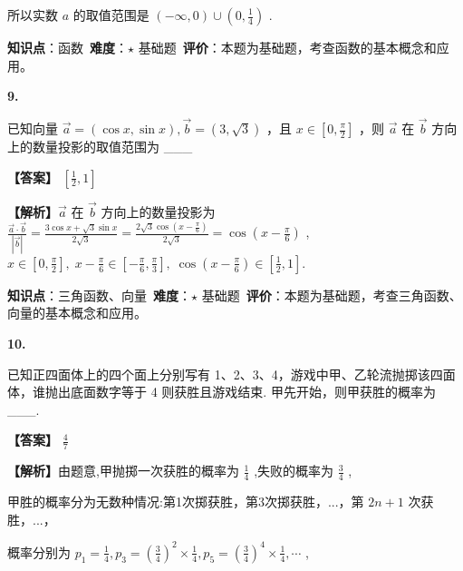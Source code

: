 \documentclass[10pt]{article}
\newenvironment{questionblock}[1]{%
  \needspace{3\baselineskip}%
  \noindent\textbf{#1.}%
}{%
  \par\vspace{1em}%
}
\begin{document}
所以实数 \(a\) 的取值范围是 \(\left( {-\infty ,0}\right)  \cup  \left( {0,\frac{1}{4}}\right)\) .

\begin{analysisbox}[考点分析]
\textbf{知识点}：函数\
\textbf{难度}：$\star$ 基础题\
\textbf{评价}：本题为基础题，考查函数的基本概念和应用。
\end{analysisbox}

\begin{questionblock}{9}
已知向量 \(\overrightarrow{a} = \left( {\cos x,\sin x}\right) ,\overrightarrow{b} = \left( {3,\sqrt{3}}\right)\) ，且 \(x \in  \left\lbrack  {0,\frac{\pi }{2}}\right\rbrack\) ，则 \(\overrightarrow{a}\) 在 \(\overrightarrow{b}\) 方向上的数量投影的取值范围为 ___
\end{questionblock}

\textbf{【答案】} \(\left\lbrack  {\frac{1}{2},1}\right\rbrack\)

\textbf{【解析】}\(\overrightarrow{a}\) 在 \(\overrightarrow{b}\) 方向上的数量投影为 \(\frac{\overrightarrow{a} \cdot  \overrightarrow{b}}{\left| \overrightarrow{b}\right| } = \frac{3\cos x + \sqrt{3}\sin x}{2\sqrt{3}} = \frac{2\sqrt{3}\cos \left( {x - \frac{\pi }{6}}\right) }{2\sqrt{3}} = \cos \left( {x - \frac{\pi }{6}}\right)\) , \(x \in  \left\lbrack  {0,\frac{\pi }{2}}\right\rbrack  ,\;x - \frac{\pi }{6} \in  \left\lbrack  {-\frac{\pi }{6},\frac{\pi }{3}}\right\rbrack  ,\;\cos \left( {x - \frac{\pi }{6}}\right)  \in  \left\lbrack  {\frac{1}{2},1}\right\rbrack  .\)

\begin{analysisbox}[考点分析]
\textbf{知识点}：三角函数、向量\
\textbf{难度}：$\star$ 基础题\
\textbf{评价}：本题为基础题，考查三角函数、向量的基本概念和应用。
\end{analysisbox}

\begin{questionblock}{10}
已知正四面体上的四个面上分别写有 1、2、3、4，游戏中甲、乙轮流抛掷该四面体，谁抛出底面数字等于 4 则获胜且游戏结束. 甲先开始，则甲获胜的概率为___.
\end{questionblock}

\textbf{【答案】} \(\frac{4}{7}\)

\textbf{【解析】}由题意,甲抛掷一次获胜的概率为 \(\frac{1}{4}\) ,失败的概率为 \(\frac{3}{4}\) ,

甲胜的概率分为无数种情况:第1次掷获胜，第3次掷获胜，...，第 \({2n} + 1\) 次获胜，...，

概率分别为 \({p}_{1} = \frac{1}{4},{p}_{3} = {\left( \frac{3}{4}\right) }^{2} \times  \frac{1}{4},{p}_{5} = {\left( \frac{3}{4}\right) }^{4} \times  \frac{1}{4},\cdots\) ,
\end{document}
